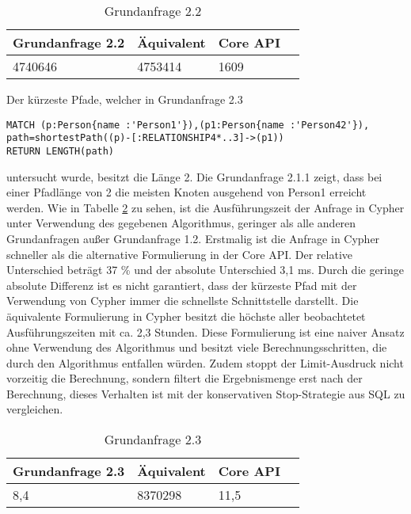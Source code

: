 \FloatBarrier
\begin{table}[h]
	\centering
		\begin{tabular}{ |p{3cm}|p{3cm}|p{3cm}|p{3cm}|  }
			\hline
			Grundanfrage 2.2 & Äquivalent&Core API\\
			\hline
			4740646    & 4753414 &  1609\\
			\hline
		\end{tabular}
		\caption{Grundanfrage 2.2}
		\label{tab:Query2_2}
\end{table}
\FloatBarrier
\noindent Der kürzeste Pfade, welcher in Grundanfrage 2.3
\begin{Verbatim}[frame=single]
MATCH (p:Person{name :'Person1'}),(p1:Person{name :'Person42'}),
path=shortestPath((p)-[:RELATIONSHIP4*..3]->(p1)) 
RETURN LENGTH(path)
\end{Verbatim} 
 untersucht wurde, besitzt die Länge 2. Die Grundanfrage 2.1.1 zeigt, dass bei einer Pfadlänge von 2 die meisten Knoten ausgehend von Person1 erreicht werden. Wie in Tabelle \ref{tab:Query2_3} zu sehen, ist die Ausführungszeit der Anfrage in Cypher unter Verwendung des gegebenen Algorithmus, geringer als alle anderen Grundanfragen außer Grundanfrage 1.2. Erstmalig ist die Anfrage in Cypher schneller als die alternative Formulierung in der Core API. Der relative Unterschied beträgt 37 \% und  der absolute Unterschied 3,1 ms. Durch die geringe absolute Differenz ist es nicht garantiert, dass der kürzeste Pfad mit der Verwendung von Cypher immer die schnellste Schnittstelle darstellt. \newline
Die äquivalente Formulierung in Cypher besitzt die höchste aller beobachtetet Ausführungszeiten mit ca. 2,3 Stunden. Diese Formulierung ist eine naiver Ansatz ohne Verwendung des Algorithmus und besitzt viele Berechnungsschritten, die durch den Algorithmus entfallen würden. Zudem stoppt der Limit-Ausdruck nicht vorzeitig die Berechnung, sondern filtert die Ergebnismenge erst nach der Berechnung, dieses Verhalten ist mit der konservativen Stop-Strategie aus SQL zu vergleichen\parencite{carey1997saying}.   
\FloatBarrier
\begin{table}[!htb]
	\centering
		\begin{tabular}{ |p{3cm}|p{3cm}|p{3cm}|p{3cm}|  }
			\hline
			Grundanfrage 2.3 & Äquivalent&Core API\\
			\hline
			8,4    & 8370298 &  11,5\\
			\hline
		\end{tabular}
		\caption{Grundanfrage 2.3}
		\label{tab:Query2_3}
\end{table}

